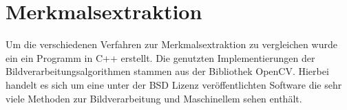 \chapter{Merkmalsextraktion}

Um die verschiedenen Verfahren zur Merkmalsextraktion zu vergleichen wurde ein ein Programm in C++ erstellt.
Die genutzten Implementierungen der Bildverarbeitungsalgorithmen stammen aus der Bibliothek OpenCV. Hierbei handelt es sich um eine unter der BSD Lizenz veröffentlichten Software die sehr viele Methoden zur Bildverarbeitung und Maschinellem sehen enthält.